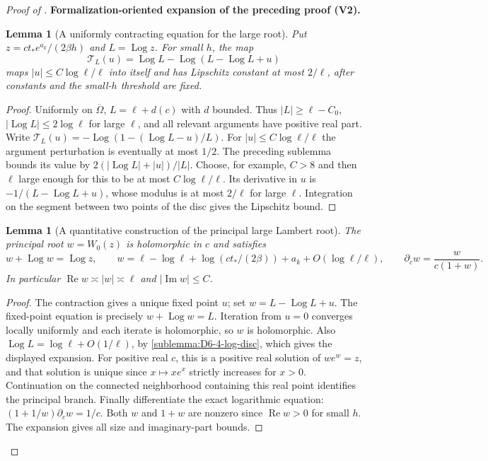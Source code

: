 \documentclass[11pt]{article}
\newtheorem{lemma}[theorem]{Lemma}
\newcommand{\formalisationparentid}{X}
\newenvironment{formalisationaddition}[1]{\par\medskip\begingroup\color{blue}\def\formalisationparentid{#1}\setcounter{formalizationsublemma}{0}\let\lemma\formalizationsublemma\let\endlemma\endformalizationsublemma
  \def\Eo{\mathcal E_h^\circ}\def\EE{\mathcal E_h}\def\phio{\phi_h^\circ}\def\phih{\phi_h}\def\Ho{H_h^{\rm atom}(v^\circ)}\def\Ha{H_h^{\rm atom}}\def\HL{H_h^{L}}\def\Dh{D_h}\def\Log{\operatorname{Log}}\def\ellh{\ell_h}\def\Gp{G_{p,h}}\def\Ast{A_{*,h}}\def\ahat{\widehat{\mathfrak a}_h}\def\ah{\mathfrak a_h}\def\rh{\widehat\rho_h}\def\deltah{\widehat\delta_h}\def\oldref##1{\textup{(##1)}}\def\interface##1{\par\noindent\textit{Analytical interface used here.} ##1\par}\def\finish{\par\noindent\textit{Conclusion of the formalization-oriented expansion.} }\par\noindent\textbf{Formalization-oriented expansion of the preceding proof (V2).}\par\smallskip
}{\par\endgroup\medskip
}
\newcommand{\Rea}{\operatorname{Re}}
\newcommand{\Ima}{\operatorname{Im}}
\begin{document}
\begin{proof}[Proof of ]
\begin{formalisationaddition}{D-T6.4}
\begin{lemma}[A uniformly contracting equation for the large root]\label{sublemma:D6-4-contraction}
Put $z=ct_*e^{a_k}/(2\beta h)$ and $L=\Log z$.
For small $h$, the map
\[
 \mathcal T_L(u)=\Log L-\Log(L-\Log L+u)
\]
maps $|u|\le C\log\ell/\ell$ into itself and has Lipschitz constant
at most $2/\ell$, after constants and the small-$h$ threshold are fixed.
\end{lemma}
\begin{proof}
Uniformly on $\overline\Omega$, $L=\ell+d(c)$ with $d$ bounded.
Thus $|L|\ge\ell-C_0$, $|\Log L|\le2\log\ell$ for large $\ell$,
and all relevant arguments have positive real part.
Write
$\mathcal T_L(u)=-\Log(1-(\Log L-u)/L)$.
For $|u|\le C\log\ell/\ell$ the argument perturbation is eventually
at most $1/2$. The preceding sublemma bounds its value by
$2(|\Log L|+|u|)/|L|$. Choose, for example, $C>8$ and then $\ell$
large enough for this to be at most $C\log\ell/\ell$.
Its derivative in $u$ is $-1/(L-\Log L+u)$, whose modulus is at most
$2/\ell$ for large $\ell$. Integration on the segment between two
points of the disc gives the Lipschitz bound.
\end{proof}

\begin{lemma}[A quantitative construction of the principal large Lambert root]\label{sublemma:D6-4-lambert}
The principal root $w=W_0(z)$ is holomorphic in $c$ and satisfies
\[
 w+\Log w=\Log z,\qquad
 w=\ell-\log\ell+\log(ct_*/(2\beta))+a_k
                  +O(\log\ell/\ell),\qquad
 \partial_cw=\frac{w}{c(1+w)}.
\]
In particular $\Rea w\asymp|w|\asymp\ell$ and $|\Ima w|\le C$.
\end{lemma}
\begin{proof}
The contraction gives a unique fixed point $u$; set $w=L-\Log L+u$.
The fixed-point equation is precisely $w+\Log w=L$.
Iteration from $u=0$ converges locally uniformly and each iterate is
holomorphic, so $w$ is holomorphic. Also
$\Log L=\log\ell+O(1/\ell)$, by \ref{sublemma:D6-4-log-disc},
which gives the displayed expansion.
For positive real $c$, this is a positive real solution of $we^w=z$,
and that solution is unique since $x\mapsto xe^x$ strictly increases
for $x>0$. Continuation on the connected neighborhood containing this
real point identifies the principal branch. Finally differentiate the
exact logarithmic equation: $(1+1/w)\partial_cw=1/c$.
Both $w$ and $1+w$ are nonzero since $\Rea w>0$ for small $h$.
The expansion gives all size and imaginary-part bounds.
\end{proof}


\end{formalisationaddition}
\end{proof}
\end{document}
